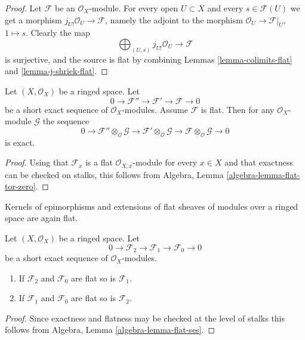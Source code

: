 \begin{proof}
Let $\mathcal{F}$ be an $\mathcal{O}_X$-module.
For every open $U \subset X$ and every
$s \in \mathcal{F}(U)$ we get a morphism
$j_{U!}\mathcal{O}_U \to \mathcal{F}$, namely the adjoint to
the morphism $\mathcal{O}_U \to \mathcal{F}|_U$, $1 \mapsto s$.
Clearly the map
$$
\bigoplus\nolimits_{(U, s)} j_{U!}\mathcal{O}_U
\longrightarrow
\mathcal{F}
$$
is surjective, and the source is flat by combining Lemmas
\ref{lemma-colimits-flat} and \ref{lemma-j-shriek-flat}.
\end{proof}

\begin{lemma}
\label{lemma-flat-tor-zero}
Let $(X, \mathcal{O}_X)$ be a ringed space.
Let
$$
0 \to \mathcal{F}'' \to \mathcal{F}' \to \mathcal{F} \to 0
$$
be a short exact sequence of $\mathcal{O}_X$-modules.
Assume $\mathcal{F}$ is flat. Then for any $\mathcal{O}_X$-module
$\mathcal{G}$ the sequence
$$
0 \to
\mathcal{F}'' \otimes_\mathcal{O} \mathcal{G} \to
\mathcal{F}' \otimes_\mathcal{O} \mathcal{G} \to
\mathcal{F} \otimes_\mathcal{O} \mathcal{G} \to 0
$$
is exact.
\end{lemma}

\begin{proof}
Using that $\mathcal{F}_x$ is a flat $\mathcal{O}_{X, x}$-module
for every $x \in X$ and that exactness can be checked on stalks, this
follows from
Algebra, Lemma \ref{algebra-lemma-flat-tor-zero}.
\end{proof}

\begin{lemma}
\label{lemma-flat-ses}
\begin{slogan}
Kernels of epimorphisms and extensions of flat sheaves of modules over
a ringed space are again flat.
\end{slogan}
Let $(X, \mathcal{O}_X)$ be a ringed space.
Let
$$
0 \to
\mathcal{F}_2 \to
\mathcal{F}_1 \to
\mathcal{F}_0 \to 0
$$
be a short exact sequence of $\mathcal{O}_X$-modules.
\begin{enumerate}
\item If $\mathcal{F}_2$ and $\mathcal{F}_0$ are flat so is
$\mathcal{F}_1$.
\item If $\mathcal{F}_1$ and $\mathcal{F}_0$ are flat so is
$\mathcal{F}_2$.
\end{enumerate}
\end{lemma}

\begin{proof}
Since exactness and flatness may be checked at the level of stalks
this follows from
Algebra, Lemma \ref{algebra-lemma-flat-ses}.
\end{proof}

